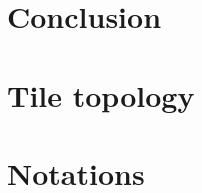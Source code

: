 \documentclass[a4paper,11pt]{report}
\begin{document}
	\chapter{Conclusion}
	
	
	\appendix
	
	\chapter{Tile topology}
	
	
	\chapter*{Notations}
	
	\newpage

	\listoftables
	
	\listoffigures
	
	\printbibliography[heading=bibintoc]
\end{document}
